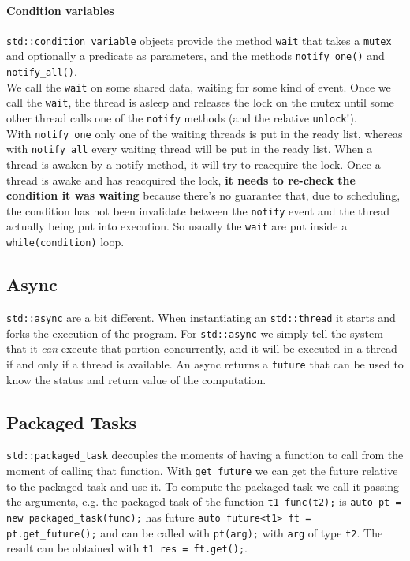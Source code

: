 \documentclass[10pt]{report}
\begin{document}
\paragraph{Condition variables} \texttt{std::condition\_variable} objects provide the method \texttt{wait} that takes a \texttt{mutex} and optionally a predicate as parameters, and the methods \texttt{notify\_one()} and \texttt{notify\_all()}.\\
We call the \texttt{wait} on some shared data, waiting for some kind of event. Once we call the \texttt{wait}, the thread is asleep and releases the lock on the mutex until some other thread calls one of the \texttt{notify} methods (and the relative \texttt{unlock}!).\\
With \texttt{notify\_one} only one of the waiting threads is put in the ready list, whereas with \texttt{notify\_all} every waiting thread will be put in the ready list. When a thread is awaken by a notify method, it will try to reacquire the lock. Once a thread is awake and has reacquired the lock, \textbf{it needs to re-check the condition it was waiting} because there's no guarantee that, due to scheduling, the condition has not been invalidate between the \texttt{notify} event and the thread actually being put into execution. So usually the \texttt{wait} are put inside a \texttt{while(condition)} loop.
\subsection{Async}
\texttt{std::async} are a bit different. When instantiating an \texttt{std::thread} it starts and forks the execution of the program. For \texttt{std::async} we simply tell the system that it \textit{can} execute that portion concurrently, and it will be executed in a thread if and only if a thread is available. An async returns a \texttt{future} that can be used to know the status and return value of the computation.
\subsection{Packaged Tasks}
\texttt{std::packaged\_task} decouples the moments of having a function to call from the moment of calling that function. With \texttt{get\_future} we can get the future relative to the packaged task and use it. To compute the packaged task we call it passing the arguments, e.g. the packaged task of the function \texttt{t1 func(t2);} is \texttt{auto pt = new packaged\_task(func);} has future \texttt{auto future<t1> ft = pt.get\_future();} and can be called with \texttt{pt(arg);} with \texttt{arg} of type \texttt{t2}. The result can be obtained with \texttt{t1 res = ft.get();}.
\end{document}
